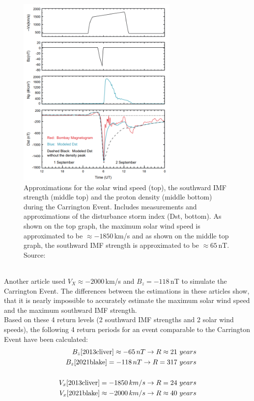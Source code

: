 \documentclass[12pt]{article}
\begin{document}
        \begin{figure}[t!]
            \centering
            \includegraphics[width=0.7\textwidth]{fig_discussion/carrington.png}
            \caption{Approximations for the solar wind speed (top), the southward IMF strength (middle top) and the proton density (middle bottom) during the Carrington Event. Includes measurements and approximations of the disturbance storm index (Dst, bottom). As shown on the top graph, the maximum solar wind speed is approximated to be $\approx -1850\,$km/s and as shown on the middle top graph, the southward IMF strength is approximated to be $\approx 65\,$nT. Source: \cite{2006xinlin}}
            \label{fig:returncarrington}
        \end{figure}\\
        Another article\cite{2021blake} used $V_X\approx -2000\,$km/s and $B_z=-118\,$nT to simulate the Carrington Event. The differences between the estimations in these articles show, that it is nearly impossible to accurately estimate the maximum solar wind speed and the maximum southward IMF strength.\\
        Based on these 4 return levels (2 southward IMF strengths and 2 solar wind speeds), the following 4 return periods for an event comparable to the Carrington Event have been calculated:
        \begin{equation}
            \begin{split}
                B_z\cite{2013cliver}\approx -65\, nT\rightarrow R\approx 21\ years\\
                B_z\cite{2021blake}=-118\, nT\rightarrow R=317\ years\\ \\
                V_x\cite{2013cliver}=-1850\, km/s\rightarrow R=24\ years\\
                V_x\cite{2021blake}\approx -2000\, km/s\rightarrow R\approx 40\ years
            \end{split}
        \end{equation}
\end{document}
